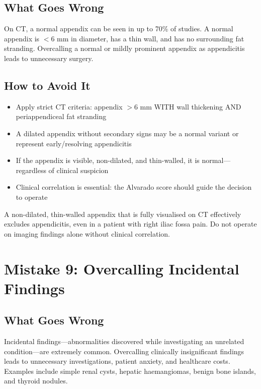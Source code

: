 \subsection{What Goes Wrong}
On CT, a normal appendix can be seen in up to 70\% of studies. A normal appendix is $<6$ mm in diameter, has a thin wall, and has no surrounding fat stranding. Overcalling a normal or mildly prominent appendix as appendicitis leads to unnecessary surgery.

\subsection{How to Avoid It}
\begin{itemize}
    \item Apply strict CT criteria: appendix $>6$ mm WITH wall thickening AND periappendiceal fat stranding
    \item A dilated appendix without secondary signs may be a normal variant or represent early/resolving appendicitis
    \item If the appendix is visible, non-dilated, and thin-walled, it is normal---regardless of clinical suspicion
    \item Clinical correlation is essential: the Alvarado score should guide the decision to operate
\end{itemize}

\begin{pearlbox}[Visible normal appendix = appendicitis excluded]
A non-dilated, thin-walled appendix that is fully visualised on CT effectively excludes appendicitis, even in a patient with right iliac fossa pain. Do not operate on imaging findings alone without clinical correlation.
\end{pearlbox}

\clearpage

\section{Mistake 9: Overcalling Incidental Findings}

\subsection{What Goes Wrong}
Incidental findings---abnormalities discovered while investigating an unrelated condition---are extremely common. Overcalling clinically insignificant findings leads to unnecessary investigations, patient anxiety, and healthcare costs. Examples include simple renal cysts, hepatic haemangiomas, benign bone islands, and thyroid nodules.

